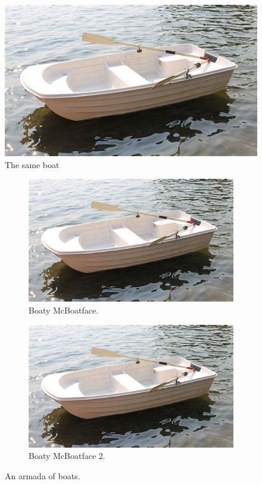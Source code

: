 \documentclass{article}
\begin{document}
    \begin{figure}[h!]
      \includegraphics[width=\linewidth]{boat.jpeg}
      \caption{The same boat}
      \label{fig:boat2}
    \end{figure}

    \begin{figure}[b]
      \centering
      \begin{subfigure}[b]{0.4\linewidth}
        \includegraphics[width=\linewidth]{boat.jpeg}
        \caption{Boaty McBoatface.}
      \end{subfigure}
      \begin{subfigure}[b]{0.4\linewidth}
        \includegraphics[width=\linewidth]{boat.jpeg}
        \caption{Boaty McBoatface 2.}
      \end{subfigure}
      \caption{An armada of boats.}
      \label{fig:boats}
    \end{figure}
\end{document}
